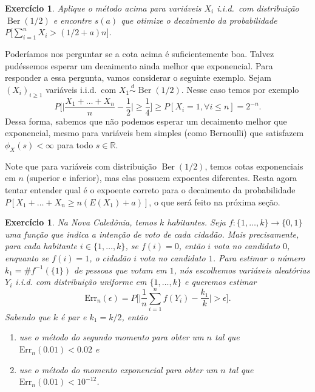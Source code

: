 \documentclass[reqno, draft]{book}
\newcommand*\1{\mathds{1}}
\newtheorem{exercise}[example]{Exercício}
\DeclareMathOperator{\Ber}{Ber}
\def \iid{i.i.d.~}
\def \distr{\overset{d}{\sim}}
\begin{document}
\begin{exercise}
  Aplique o método acima para variáveis $X_i$ \iid com distribuição $\Ber(1/2)$ e encontre $s(a)$ que otimize o decaimento da probabilidade $P\big[\sum_{i=1}^n X_i > (1/2 + a) n \big]$.
\end{exercise}

Poderíamos nos perguntar se a cota acima é suficientemente boa.
Talvez pudéssemos esperar um decaimento ainda melhor que exponencial.
Para responder a essa pergunta, vamos considerar o seguinte exemplo.
Sejam $(X_i)_{i \geq 1}$ variáveis \iid com $X_1 \distr \Ber(1/2)$.
Nesse caso temos por exemplo
\begin{equation}
  P\Big[ \big| \frac{X_1 + \dots + X_n}{n} - \frac 12 \big| \geq \frac 14\Big] \geq P[X_i = 1, \forall i \leq n] = 2^{-n}.
\end{equation}
Dessa forma, sabemos que não podemos esperar um decaimento melhor que exponencial, mesmo para variáveis bem simples (como Bernoulli) que satisfazem $\phi_X(s) < \infty$ para todo $s \in \mathbb{R}$.

Note que para variáveis com distribuição $\Ber(1/2)$, temos cotas exponenciais em $n$ (superior e inferior), mas elas possuem expoentes diferentes.
Resta agora tentar entender qual é o expoente correto para o decaimento da probabilidade $P[X_1 + \dots + X_n \geq n(E(X_1) + a)]$, o que será feito na próxima seção.

\begin{exercise}
  Na Nova Caledônia, temos $k$ habitantes.
  Seja $f:\{1, \dots, k\} \to \{0,1\}$ uma função que indica a intenção de voto de cada cidadão.
  Mais precisamente, para cada habitante $i \in \{1, \dots, k\}$, se $f(i) = 0$, então $i$ vota no candidato $0$, enquanto se $f(i) = 1$, o cidadão $i$ vota no candidato $1$.
  Para estimar o número $k_1 = \# f^{-1}(\{1\})$ de pessoas que votam em $1$, nós escolhemos variáveis aleatórias $Y_i$ i.i.d. com distribuição uniforme em $\{1, \dots, k\}$ e queremos estimar
  \begin{equation}
    \text{Err}_n(\epsilon) = P \Big[ \Big| \frac{1}{n} \sum_{i=1}^n f(Y_i) - \frac{k_1}{k} \Big| > \epsilon \Big].
  \end{equation}
  Sabendo que $k$ é par e $k_1 = k/2$, então
  \begin{enumerate}[\quad a)]
  \item use o método do segundo momento para obter um $n$ tal que $\text{Err}_{n}(0.01) < 0.02$ e
  \item use o método do momento exponencial para obter um $n$ tal que $\text{Err}_{n}(0.01) < 10^{-12}$.
  \end{enumerate}
\end{exercise}
\end{document}
